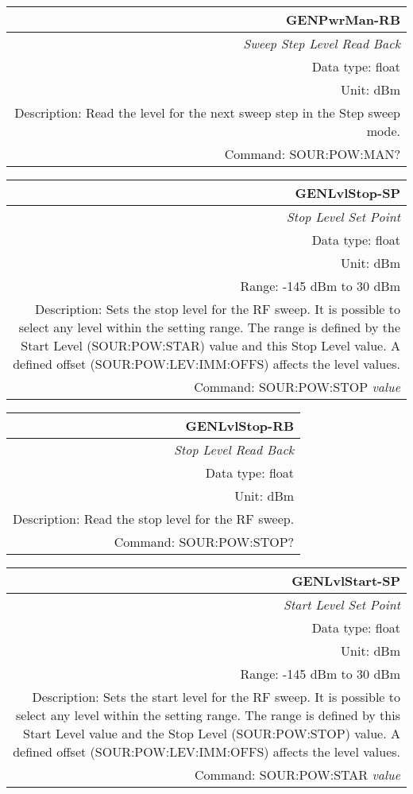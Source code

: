 \documentclass[openany]{article}
\begin{document}
		\begin{tabular}{N}
			\hline
			\bfseries GENPwrMan-RB \\ \hline
			\emph{Sweep Step Level Read Back} \\
			Data type: float \\
			Unit: dBm \\
			Description: Read the level for the next sweep step in the Step sweep mode. \\
			Command: SOUR:POW:MAN? \\

		\end{tabular}
%
		\begin{tabular}{N}
			\hline
			\bfseries GENLvlStop-SP \\ \hline
			\emph{Stop Level Set Point} \\
			Data type: float \\
			Unit: dBm \\
			Range: -145 dBm to 30 dBm \\
			Description: Sets the stop level for the RF sweep. It is possible to select any level within the setting range. The range is defined by the Start Level (SOUR:POW:STAR) value and this Stop Level value. A defined offset (SOUR:POW:LEV:IMM:OFFS) affects the level values. \\
			Command: SOUR:POW:STOP \emph{value} \\

		\end{tabular}


		\begin{tabular}{N}
			\hline
			\bfseries GENLvlStop-RB \\ \hline
			\emph{Stop Level Read Back} \\
			Data type: float \\
			Unit: dBm \\
			Description: Read the stop level for the RF sweep. \\
			Command: SOUR:POW:STOP? \\

		\end{tabular}
%
		\begin{tabular}{N}
			\hline
			\bfseries GENLvlStart-SP \\ \hline
			\emph{Start Level Set Point} \\
			Data type: float \\
			Unit: dBm \\
			Range: -145 dBm to 30 dBm \\
			Description: Sets the start level for the RF sweep. It is possible to select any level within the setting range. The range is defined by this Start Level value and the Stop Level (SOUR:POW:STOP) value. A defined offset (SOUR:POW:LEV:IMM:OFFS) affects the level values. \\
			Command: SOUR:POW:STAR \emph{value} \\

		\end{tabular}
\end{document}

